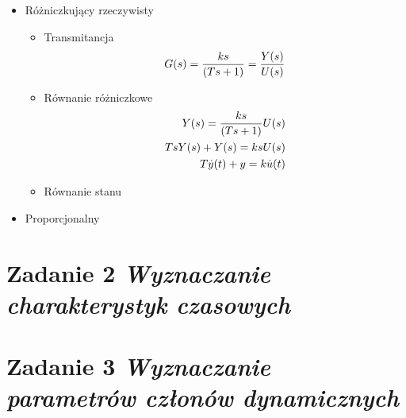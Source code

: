 \documentclass[a4paper,10pt]{article}
\begin{document}
\begin{itemize}
\item Różniczkujący rzeczywisty
\begin{itemize}
\item Transmitancja
	\begin{eqnarray}
		G(s)= {ks \over \left({Ts + 1}\right)} = {Y(s) \over U(s)}
	\end{eqnarray}
\item Równanie różniczkowe
	\begin{eqnarray}
		Y(s) = {ks \over \left({Ts + 1}\right)}  U(s)\\
		\nonumber TsY(s)+Y(s)=k s U(s)\\
		\nonumber T\dot{y}(t)+y=k\dot{u}(t)
	\end{eqnarray}
\item Równanie stanu
\end{itemize}

\item Proporcjonalny

\end{itemize}

\section{Zadanie 2 \textit{\small Wyznaczanie charakterystyk czasowych}}\label{sec:zad2}

\section{Zadanie 3 \textit{\small Wyznaczanie parametrów członów dynamicznych}}\label{sec:zad3}
\end{document}

